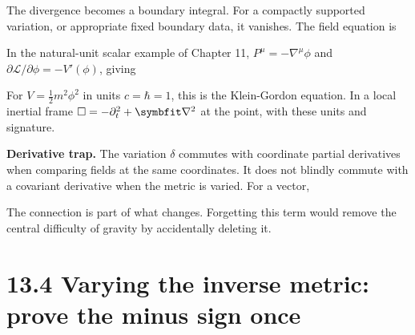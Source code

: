 \documentclass[
  11pt,
  letterpaper,
  oneside,
  openany]{scrbook}
\begin{document}
The divergence becomes a boundary integral. For a compactly supported
variation, or appropriate fixed boundary data, it vanishes. The field
equation is

\begin{center}
\begingroup
{}
\ifdim\wd\grmathbox>\linewidth
\resizebox{\linewidth}{!}{\usebox{\grmathbox}}
\else\usebox{\grmathbox}\fi
\endgroup
\end{center}

In the natural-unit scalar example of Chapter 11,
\(P^\mu=-\nabla^\mu\phi\) and
\(\partial\mathcal L/\partial\phi=-V'(\phi)\), giving

\begin{center}
\begingroup
{}
\ifdim\wd\grmathbox>\linewidth
\resizebox{\linewidth}{!}{\usebox{\grmathbox}}
\else\usebox{\grmathbox}\fi
\endgroup
\end{center}

For \(V=\frac12m^2\phi^2\) in units \(c=\hbar=1\), this is the
Klein-Gordon equation. In a local inertial frame
\(\Box=-\partial_t^2+\symbfit\nabla^2\) at the point, with these units
and signature.

\textbf{Derivative trap.} The variation \(\delta\) commutes with
coordinate partial derivatives when comparing fields at the same
coordinates. It does not blindly commute with a covariant derivative
when the metric is varied. For a vector,

\begin{center}
\begingroup
{}
\ifdim\wd\grmathbox>\linewidth
\resizebox{\linewidth}{!}{\usebox{\grmathbox}}
\else\usebox{\grmathbox}\fi
\endgroup
\end{center}

The connection is part of what changes. Forgetting this term would
remove the central difficulty of gravity by accidentally deleting it.

\hypertarget{varying-the-inverse-metric-prove-the-minus-sign-once}{%
\section{13.4 Varying the inverse metric: prove the minus sign
once}\label{varying-the-inverse-metric-prove-the-minus-sign-once}}
\end{document}
